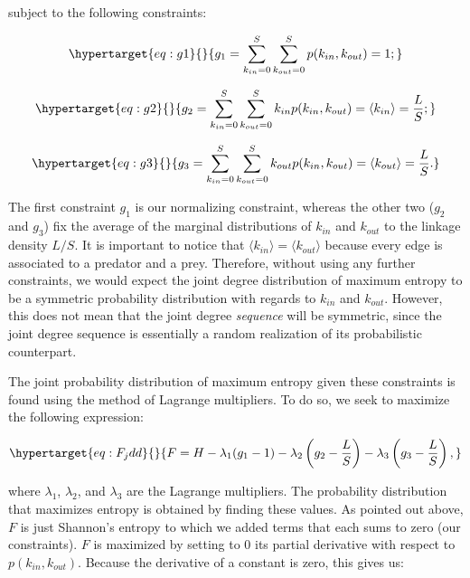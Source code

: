 \documentclass[11pt]{article}
\begin{document}
subject to the following constraints:

\begin{equation}\protect\hypertarget{eq:g1}{}{g_1 = \sum_{k_{in}=0}^S\sum_{k_{out}=0}^S p(k_{in},k_{out}) = 1;}\label{eq:g1}\end{equation}

\begin{equation}\protect\hypertarget{eq:g2}{}{g_2 = \sum_{k_{in}=0}^S\sum_{k_{out}=0}^S k_{in} p(k_{in},k_{out}) = \langle k_{in} \rangle = \frac{L}{S};}\label{eq:g2}\end{equation}

\begin{equation}\protect\hypertarget{eq:g3}{}{g_3 = \sum_{k_{in}=0}^S\sum_{k_{out}=0}^S k_{out} p(k_{in},k_{out}) = \langle k_{out} \rangle = \frac{L}{S}.}\label{eq:g3}\end{equation}

The first constraint \(g_1\) is our normalizing constraint, whereas the
other two (\(g_2\) and \(g_3\)) fix the average of the marginal
distributions of \(k_{in}\) and \(k_{out}\) to the linkage density
\(L/S\). It is important to notice that
\(\langle k_{in} \rangle = \langle k_{out} \rangle\) because every edge
is associated to a predator and a prey. Therefore, without using any
further constraints, we would expect the joint degree distribution of
maximum entropy to be a symmetric probability distribution with regards
to \(k_{in}\) and \(k_{out}\). However, this does not mean that the
joint degree \emph{sequence} will be symmetric, since the joint degree
sequence is essentially a random realization of its probabilistic
counterpart.

The joint probability distribution of maximum entropy given these
constraints is found using the method of Lagrange multipliers. To do so,
we seek to maximize the following expression:

\begin{equation}\protect\hypertarget{eq:F_jdd}{}{F = H - \lambda_1(g_1-1)-\lambda_2\left( g_2-\frac{L}{S}\right) - \lambda_3 \left( g_3-\frac{L}{S}\right),}\label{eq:F_jdd}\end{equation}

where \(\lambda_1\), \(\lambda_2\), and \(\lambda_3\) are the Lagrange
multipliers. The probability distribution that maximizes entropy is
obtained by finding these values. As pointed out above, \(F\) is just
Shannon's entropy to which we added terms that each sums to zero (our
constraints). \(F\) is maximized by setting to 0 its partial derivative
with respect to \(p(k_{in},k_{out})\). Because the derivative of a
constant is zero, this gives us:
\end{document}
